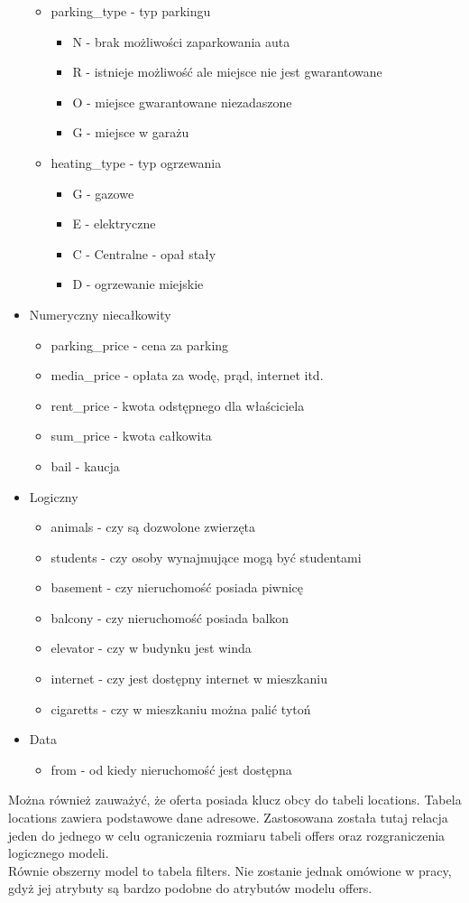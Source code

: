 \begin{itemize}
\begin{itemize}
\item parking\_type - typ parkingu
\begin{itemize}
\item N - brak możliwości zaparkowania auta
\item R - istnieje możliwość ale miejsce nie jest gwarantowane
\item O - miejsce gwarantowane niezadaszone
\item G - miejsce w garażu
\end{itemize} 
\item heating\_type - typ ogrzewania
\begin{itemize}
\item G - gazowe
\item E - elektryczne
\item C - Centralne - opał stały
\item D - ogrzewanie miejskie
\end{itemize}
\end{itemize}
\item Numeryczny niecałkowity
\begin{itemize}
\item parking\_price - cena za parking
\item media\_price - opłata za wodę, prąd, internet itd.
\item rent\_price - kwota odstępnego dla właściciela 
\item sum\_price - kwota całkowita
\item bail - kaucja
\end{itemize}
\item Logiczny
\begin{itemize}
\item animals - czy są dozwolone zwierzęta
\item students - czy osoby wynajmujące mogą być studentami
\item basement - czy nieruchomość posiada piwnicę
\item balcony - czy nieruchomość posiada balkon
\item elevator - czy w budynku jest winda
\item internet - czy jest dostępny internet w mieszkaniu
\item cigaretts - czy w mieszkaniu można palić tytoń
\end{itemize}
\item Data
\begin{itemize}
\item from - od kiedy nieruchomość jest dostępna
\end{itemize}
\end{itemize} 
Można również zauważyć, że oferta posiada klucz obcy do tabeli locations. Tabela locations zawiera podstawowe dane adresowe. Zastosowana została tutaj relacja jeden do jednego w celu ograniczenia rozmiaru tabeli offers oraz rozgraniczenia logicznego modeli.\\
Równie obszerny model to tabela filters. Nie zostanie jednak omówione w pracy, gdyż jej atrybuty są bardzo podobne do atrybutów modelu offers.
